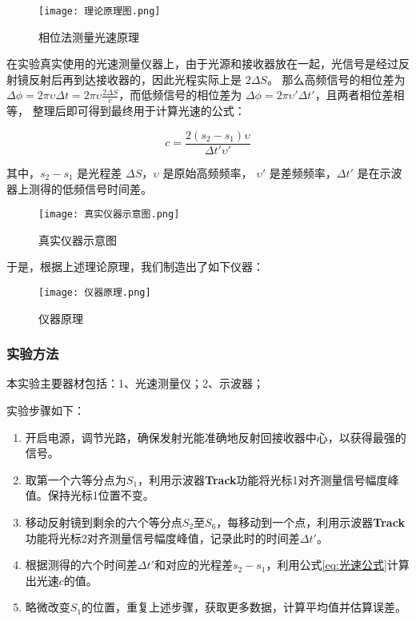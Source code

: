 \documentclass[]{../template/Report}%
\begin{document}
\begin{figure}[H]
    \centering
    \texttt{[image: 理论原理图.png]}
    \caption{相位法测量光速原理}
    \label{fig:相位法原理}
\end{figure}

在实验真实使用的光速测量仪器上，由于光源和接收器放在一起，光信号是经过反射镜反射后再到达接收器的，因此光程实际上是 $2\Delta S$。
那么高频信号的相位差为 $\Delta\phi = 2\pi \upsilon  \Delta t = 2\pi \upsilon  \frac{2\Delta S}{c}$，而低频信号的相位差为 $\Delta\phi = 2\pi \upsilon ' \Delta t'$，且两者相位差相等，
整理后即可得到最终用于计算光速的公式：

\begin{equation}
\label{eq:光速公式}
c = \frac{2(s_2 - s_1)\upsilon }{\Delta t' \upsilon '}
\end{equation}

其中，$s_2 - s_1$ 是光程差 $\Delta S$，$\upsilon $ 是原始高频频率， $\upsilon '$ 是差频频率，$\Delta t'$ 是在示波器上测得的低频信号时间差。

\begin{figure}[H]
    \centering
    \texttt{[image: 真实仪器示意图.png]}
    \caption{真实仪器示意图}
    \label{fig:真实仪器示意图}
\end{figure}

于是，根据上述理论原理，我们制造出了如下仪器：
\begin{figure}[H]
    \centering
    \texttt{[image: 仪器原理.png]}
    \caption{仪器原理}
    \label{fig:仪器原理}
\end{figure}


\subsubsection{实验方法}
本实验主要器材包括：1、光速测量仪；2、示波器；

实验步骤如下：

\begin{enumerate}
    \item 开启电源，调节光路，确保发射光能准确地反射回接收器中心，以获得最强的信号。

    \item 取第一个六等分点为$S_1$，利用示波器\textbf{Track}功能将光标1对齐测量信号幅度峰值。保持光标1位置不变。

    \item 移动反射镜到剩余的六个等分点$S_2$至$S_6$，每移动到一个点，利用示波器\textbf{Track}功能将光标2对齐测量信号幅度峰值，记录此时的时间差$\Delta t'$。

    \item 根据测得的六个时间差$\Delta t'$和对应的光程差$s_2 - s_1$，利用公式\eqref{eq:光速公式}计算出光速$c$的值。

    \item 略微改变$S_1$的位置，重复上述步骤，获取更多数据，计算平均值并估算误差。

\end{enumerate}
\end{document}
